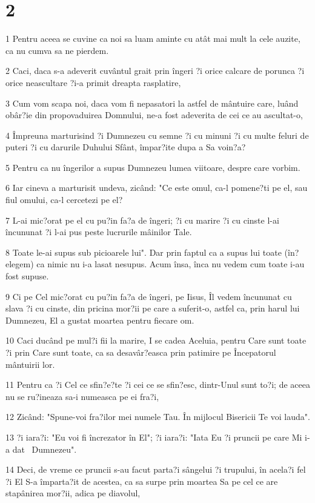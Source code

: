 \chapter{2}

\par 1 Pentru aceea se cuvine ca noi sa luam aminte cu atât mai mult la cele auzite, ca nu cumva sa ne pierdem.
\par 2 Caci, daca s-a adeverit cuvântul grait prin îngeri ?i orice calcare de porunca ?i orice neascultare ?i-a primit dreapta rasplatire,
\par 3 Cum vom scapa noi, daca vom fi nepasatori la astfel de mântuire care, luând obâr?ie din propovaduirea Domnului, ne-a fost adeverita de cei ce au ascultat-o,
\par 4 Împreuna marturisind ?i Dumnezeu cu semne ?i cu minuni ?i cu multe feluri de puteri ?i cu darurile Duhului Sfânt, împar?ite dupa a Sa voin?a?
\par 5 Pentru ca nu îngerilor a supus Dumnezeu lumea viitoare, despre care vorbim.
\par 6 Iar cineva a marturisit undeva, zicând: "Ce este omul, ca-l pomene?ti pe el, sau fiul omului, ca-l cercetezi pe el?
\par 7 L-ai mic?orat pe el cu pu?in fa?a de îngeri; ?i cu marire ?i cu cinste l-ai încununat ?i l-ai pus peste lucrurile mâinilor Tale.
\par 8 Toate le-ai supus sub picioarele lui". Dar prin faptul ca a supus lui toate (în?elegem) ca nimic nu i-a lasat nesupus. Acum însa, înca nu vedem cum toate i-au fost supuse.
\par 9 Ci pe Cel mic?orat cu pu?in fa?a de îngeri, pe Iisus, Îl vedem încununat cu slava ?i cu cinste, din pricina mor?ii pe care a suferit-o, astfel ca, prin harul lui Dumnezeu, El a gustat moartea pentru fiecare om.
\par 10 Caci ducând pe mul?i fii la marire, I se cadea Aceluia, pentru Care sunt toate ?i prin Care sunt toate, ca sa desavâr?easca prin patimire pe Începatorul mântuirii lor.
\par 11 Pentru ca ?i Cel ce sfin?e?te ?i cei ce se sfin?esc, dintr-Unul sunt to?i; de aceea nu se ru?ineaza sa-i numeasca pe ei fra?i,
\par 12 Zicând: "Spune-voi fra?ilor mei numele Tau. În mijlocul Bisericii Te voi lauda".
\par 13 ?i iara?i: "Eu voi fi încrezator în El"; ?i iara?i: "Iata Eu ?i pruncii pe care Mi i-a dat  Dumnezeu".
\par 14 Deci, de vreme ce pruncii s-au facut parta?i sângelui ?i trupului, în acela?i fel ?i El S-a împarta?it de acestea, ca sa surpe prin moartea Sa pe cel ce are stapânirea mor?ii, adica pe diavolul,
